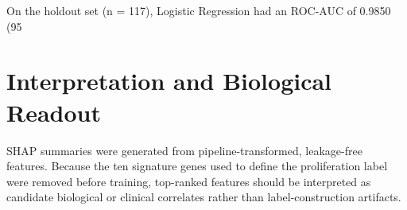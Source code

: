 \documentclass[11pt]{article}
\begin{document}
On the holdout set (n = 117), Logistic Regression had an ROC-AUC of 0.9850 (95%

\section{Interpretation and Biological Readout}
SHAP summaries were generated from pipeline-transformed, leakage-free features. Because the ten signature genes used to define the proliferation label were removed before training, top-ranked features should be interpreted as candidate biological or clinical correlates rather than label-construction artifacts.
\end{document}
